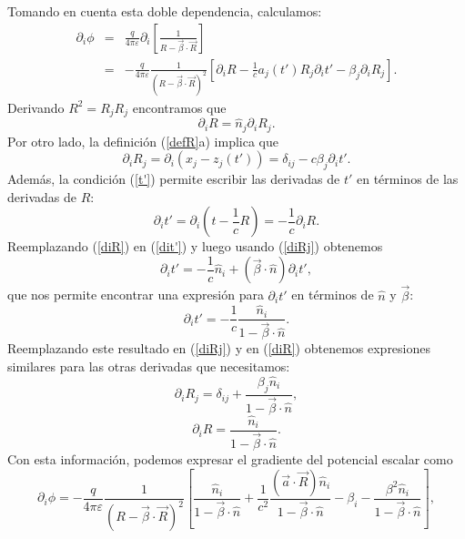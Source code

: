 Tomando en cuenta esta doble dependencia, calculamos:
\begin{eqnarray}
 \partial_i\phi&=&\frac{q}{4\pi\varepsilon}\partial_i\left[\frac{1}{R-\vec{\beta}\cdot\vec{R}}\right] \\
&=&-\frac{q}{4\pi\varepsilon}\frac{1}{(R-\vec{\beta}\cdot\vec{R})^2}\left[\partial_iR-\frac{1}{c}a_j(t')R_j\partial_i t'-\beta_j\partial_iR_j\right].
\end{eqnarray}
Derivando $R^2=R_jR_j$ encontramos que
\begin{equation}
\partial_i R=\hat{n}_j\partial_i R_j. \label{diR}
\end{equation}
Por otro lado, la definición (\ref{defR}a) implica que
\begin{equation}
 \partial_i R_j=\partial_i( x_j-z_j(t'))=\delta_{ij}-c\beta_j\partial_i t' . \label{diRj}
\end{equation}
Además, la condición (\ref{t'}) permite escribir las derivadas de $t'$ en términos de las derivadas de $R$:
\begin{equation}
 \partial_i t'=\partial_i(t-\frac{1}{c}R)=-\frac{1}{c}\partial_iR. \label{dit'}
\end{equation}
Reemplazando (\ref{diR}) en (\ref{dit'})  y luego usando (\ref{diRj}) obtenemos
\begin{equation}
 \partial_i t'=-\frac{1}{c}\hat{n}_i+(\vec{\beta}\cdot\hat{n})\partial_it', \label{dit'2}
\end{equation}
que nos permite encontrar una expresión para $\partial_it'$ en términos de $\hat{n}$ y $\vec{\beta}$:
\begin{equation}
 \boxed{\partial_i t'=-\frac{1}{c}\frac{\hat{n}_i}{1-\vec{\beta}\cdot\hat{n}}.}
\end{equation}
Reemplazando este resultado en (\ref{diRj}) y en (\ref{diR}) obtenemos expresiones similares para las otras derivadas que necesitamos:
\begin{equation}
 \boxed{\partial_i R_j=\delta_{ij}+\frac{\beta_j\hat{n}_i}{1-\vec{\beta}\cdot\hat{n}},}
\end{equation}
\begin{equation}
\boxed{\partial_i R=\frac{\hat{n}_i}{1-\vec{\beta}\cdot\hat{n}}.}
\end{equation}
Con esta información, podemos expresar el gradiente del potencial escalar como
\begin{equation}
 \partial_i\phi=-\frac{q}{4\pi\varepsilon}\frac{1}{(R-\vec{\beta}\cdot\vec{R})^2} \left[\frac{\hat{n}_i}{1-\vec{\beta}\cdot\hat{n}}+\frac{1}{c^2}\frac{(\vec{a}\cdot\vec{R})\hat{n}_i}{1-\vec{\beta}\cdot\hat{n}} -\beta_i-\frac{\beta^2\hat{n}_i}{1-\vec{\beta}\cdot\hat{n}}\right],
\end{equation}

